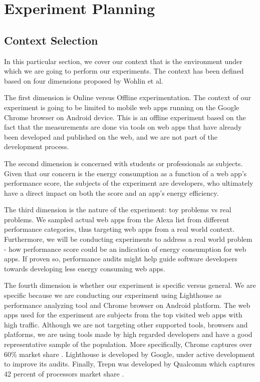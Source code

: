 \section{Experiment Planning}


\subsection{Context Selection}

In this particular section, we cover our context that is the environment under which we are going to perform our experiments. The context has been defined based on four dimensions proposed by Wohlin et al. \cite{Book:Exp}

The first dimension is Online versus Offline experimentation. The context of our experiment is going to be limited to mobile web apps running on the Google Chrome browser on Android device. This is an offline experiment based on the fact that the measurements are done via tools on web apps that have already been developed and published on the web, and we are not part of the development process.

The second dimension is concerned with students or professionals as subjects. Given that our concern is the energy consumption as a function of a web app's performance score, the subjects of the experiment are developers, who ultimately have a direct impact on both the score and an app's energy efficiency.

The third dimension is the nature of the experiment: toy problems vs real problems. We sampled actual web apps from the Alexa list from different performance categories, thus targeting web apps from a real world context. Furthermore, we will be conducting experiments to address a real world problem - how performance score could be an indication of energy consumption for web apps. If proven so, performance audits might help guide software developers towards developing less energy consuming web apps.

 The fourth dimension is whether our experiment is specific versus general. We are specific because we are conducting our experiment using Lighthouse as performance analyzing tool and Chrome browser on Android platform. The web apps used for the experiment are subjects from the top visited web apps with high traffic. Although we are not targeting other supported tools, browsers and platforms, we are using tools made by high regarded developers and have a good representative sample of the population. More specifically, Chrome captures over 60\% market share \cite{WEBSITE:16}. Lighthouse is developed by Google, under active development to improve its audits. Finally, Trepn was developed by Qualcomm which captures 42 percent of processors market share \cite{WEBSITE:17}. \newline


